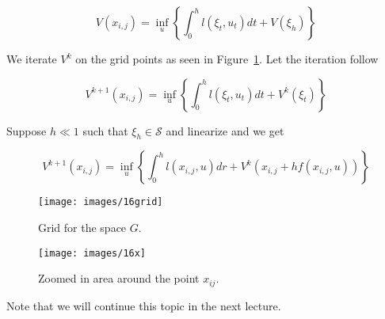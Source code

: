 \begin{equation*}
V(x_{i,j}) = \inf_u\left\lbrace \int_0^h l(\xi_t,u_t)dt+V(\xi_h)\right\rbrace
\end{equation*}

We iterate $V^k$ on the grid points as seen in Figure~\ref{fig:16grid}.
Let the iteration follow

\begin{equation*}
V^{k+1}(x_{i,j}) = \inf_u\left\lbrace \int_0^h l(\xi_t,u_t)dt + V^k(\xi_t)\right\rbrace
\end{equation*}

Suppose $h\ll 1$ such that $\xi_h\in\mathcal{S}$ and linearize and we get

\begin{equation*}
V^{k+1}(x_{i,j}) = \inf_u\left\lbrace \int_0^h l(x_{i,j},u)dr+V^k(x_{i,j}+hf(x_{i,j},u))\right\rbrace
\end{equation*}

\begin{figure}[ht!]
\centering
\texttt{[image: images/16grid]}
\caption{Grid for the space $G$.}%
\label{fig:16grid}
\end{figure}

\begin{figure}[ht!]
\centering
\texttt{[image: images/16x]}
\caption{Zoomed in area around the point $x_{ij}$.}%
\label{fig:16x}
\end{figure}

Note that we will continue this topic in the next lecture.%
